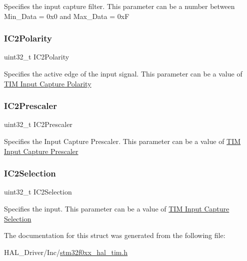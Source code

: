 Specifies the input capture filter. This parameter can be a number between Min\+\_\+\+Data = 0x0 and Max\+\_\+\+Data = 0xF \mbox{\label{struct_t_i_m___encoder___init_type_def_a67a8a854c58aedd9d37aa9f2ad4f49b4}} 
\subsubsection{\texorpdfstring{I\+C2\+Polarity}{IC2Polarity}}
{\footnotesize\ttfamily uint32\+\_\+t I\+C2\+Polarity}

Specifies the active edge of the input signal. This parameter can be a value of \hyperlink{group___t_i_m___input___capture___polarity}{T\+IM Input Capture Polarity} \mbox{\label{struct_t_i_m___encoder___init_type_def_a0ce08ea64b9e8986336acf65fbfc1976}} 
\subsubsection{\texorpdfstring{I\+C2\+Prescaler}{IC2Prescaler}}
{\footnotesize\ttfamily uint32\+\_\+t I\+C2\+Prescaler}

Specifies the Input Capture Prescaler. This parameter can be a value of \hyperlink{group___t_i_m___input___capture___prescaler}{T\+IM Input Capture Prescaler} \mbox{\label{struct_t_i_m___encoder___init_type_def_af5b15660e7593a0fa62ee00059b3a9f4}} 
\subsubsection{\texorpdfstring{I\+C2\+Selection}{IC2Selection}}
{\footnotesize\ttfamily uint32\+\_\+t I\+C2\+Selection}

Specifies the input. This parameter can be a value of \hyperlink{group___t_i_m___input___capture___selection}{T\+IM Input Capture Selection} 

The documentation for this struct was generated from the following file\+:\begin{DoxyCompactItemize}
\item 
H\+A\+L\+\_\+\+Driver/\+Inc/\hyperlink{stm32f0xx__hal__tim_8h}{stm32f0xx\+\_\+hal\+\_\+tim.\+h}\end{DoxyCompactItemize}
